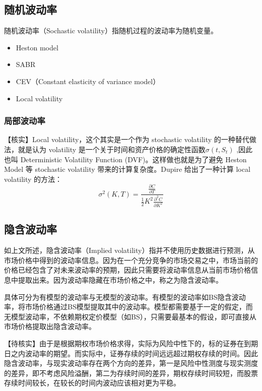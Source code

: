 \documentclass[11pt]{article}
\begin{document}
\subsection{随机波动率}

随机波动率（Sochastic volatility）指随机过程的波动率为随机变量。
\begin{itemize}
    \item Heston model
    \item SABR
    \item CEV（Constant elasticity of variance model）
    \item Local volatility
\end{itemize}

\subsubsection{局部波动率}

【核实】Local volatility，这个其实是一个作为 stochastic volatility 的一种替代做法，就是认为 volatility 是一个关于时间和资产价格的确定性函数$\sigma(t,S_t)$ ,因此也叫 Deterministic Volatility Function (DVF)。这样做也就是为了避免 Heston Model 等 stochastic volatility 带来的计算复杂度。Dupire 给出了一种计算 local volatility 的方法：
\begin{equation*}
    \sigma^2(K,T) = \frac{\frac{\partial C}{\partial T}}{\frac{1}{2} K^2 \frac{\partial^2 C}{\partial K^2}}
\end{equation*}

\subsection{隐含波动率}

如上文所述，隐含波动率（Implied volatility）指并不使用历史数据进行预测，从市场价格中得到的波动率信息。因为在一个充分竞争的市场交易之中，市场当前的价格已经包含了对未来波动率的预期，因此只需要将波动率信息从当前市场价格信息中提取出来。因为波动率隐藏在市场价格之中，称之为隐含波动率。

具体可分为有模型的波动率与无模型的波动率。有模型的波动率如BS隐含波动率，将市场价格通过BS模型提取其中的波动率。模型都需要基于一定的假定，而无模型波动率，不依赖期权定价模型（如BS），只需要最基本的假设，即可直接从市场价格提取出隐含波动率。

【待核实】由于是根据期权市场价格求得，实际为风险中性下的，标的证券在到期日之内波动率的期望。而实际中，证券存续的时间远远超过期权存续的时间。因此隐含波动率，与现实波动率存在两个方向的差异，第一是风险中性测度与现实测度的差异，即不考虑风险溢酬，第二为存续时间的差异，期权存续时间较短，而股票存续时间较长，在较长的时间内波动应该相对更为平稳。
\end{document}
